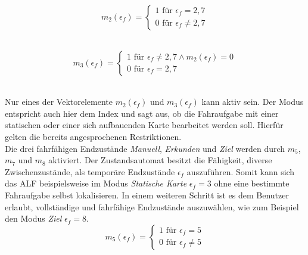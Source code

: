 		\begin{figure}[H]
			\centering
			\begin{minipage}[b]{0.4\textwidth}
				\begin{equation}
					m_2(\epsilon_f)=\left\{\begin{array}{ll} 1 \text{ für } \epsilon_f=2,7 \\
					0 \text{ für }\epsilon_f\neq 2,7\end{array}\right. 
					\label{eq: m2}
				\end{equation}\\
			\end{minipage}
			\hfill
			\begin{minipage}[b]{0.55\textwidth}
				\begin{equation}
					m_3(\epsilon_f)=\left\{\begin{array}{ll} 1 \text{ für } \epsilon_f\neq2,7 \wedge m_2(\epsilon_f) = 0 \\
					0 \text{ für }\epsilon_f= 2,7\end{array}\right.
					\label{eq: m3}
				\end{equation}\\
			\end{minipage}
		\end{figure}
		
		Nur eines der Vektorelemente $m_2(\epsilon_f)$ und $m_3(\epsilon_f)$ kann aktiv sein. Der Modus entspricht auch hier dem Index und sagt aus, ob die Fahraufgabe mit einer statischen oder einer sich aufbauenden Karte bearbeitet werden soll. Hierfür gelten die bereits angesprochenen Restriktionen.\\
		
		Die drei fahrfähigen Endzustände \textit{Manuell}, \textit{Erkunden} und \textit{Ziel} werden durch $m_5$, $m_7$ und $m_8$ aktiviert. Der Zustandsautomat besitzt die Fähigkeit, diverse Zwischenzustände, als temporäre Endzustände $\epsilon_f$ auszuführen. Somit kann sich das ALF beispielsweise im Modus \textit{Statische Karte} $\epsilon_f=3$ ohne eine bestimmte Fahraufgabe selbst lokalisieren. In einem weiteren Schritt ist es dem Benutzer erlaubt, vollständige und fahrfähige Endzustände auszuwählen, wie zum Beispiel den Modus \textit{Ziel} $\epsilon_f=8$.\\
		
		
				\begin{equation}
					m_5(\epsilon_f)=\left\{\begin{array}{ll} 1 \text{ für } \epsilon_f=5 \\
						0 \text{ für }\epsilon_f\neq 5\end{array}\right. 
					\label{eq: m5}
				\end{equation}\\
			
